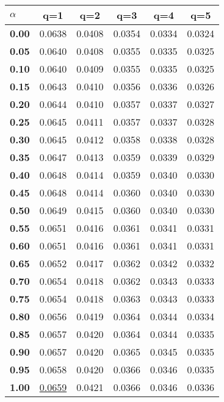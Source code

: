 \begin{tabular}{ | l || c | c | c | c | c |}
\hline
\textbf{$\alpha$} & \textbf{}q=1} & \textbf{}q=2} & \textbf{}q=3} & \textbf{}q=4} & \textbf{}q=5} \\
\hline
\textbf{0.00} & 0.0638 & 0.0408 & 0.0354 & 0.0334 & 0.0324\\
\hline
\textbf{0.05} & 0.0640 & 0.0408 & 0.0355 & 0.0335 & 0.0325\\
\hline
\textbf{0.10} & 0.0640 & 0.0409 & 0.0355 & 0.0335 & 0.0325\\
\hline
\textbf{0.15} & 0.0643 & 0.0410 & 0.0356 & 0.0336 & 0.0326\\
\hline
\textbf{0.20} & 0.0644 & 0.0410 & 0.0357 & 0.0337 & 0.0327\\
\hline
\textbf{0.25} & 0.0645 & 0.0411 & 0.0357 & 0.0337 & 0.0328\\
\hline
\textbf{0.30} & 0.0645 & 0.0412 & 0.0358 & 0.0338 & 0.0328\\
\hline
\textbf{0.35} & 0.0647 & 0.0413 & 0.0359 & 0.0339 & 0.0329\\
\hline
\textbf{0.40} & 0.0648 & 0.0414 & 0.0359 & 0.0340 & 0.0330\\
\hline
\textbf{0.45} & 0.0648 & 0.0414 & 0.0360 & 0.0340 & 0.0330\\
\hline
\textbf{0.50} & 0.0649 & 0.0415 & 0.0360 & 0.0340 & 0.0330\\
\hline
\textbf{0.55} & 0.0651 & 0.0416 & 0.0361 & 0.0341 & 0.0331\\
\hline
\textbf{0.60} & 0.0651 & 0.0416 & 0.0361 & 0.0341 & 0.0331\\
\hline
\textbf{0.65} & 0.0652 & 0.0417 & 0.0362 & 0.0342 & 0.0332\\
\hline
\textbf{0.70} & 0.0654 & 0.0418 & 0.0362 & 0.0343 & 0.0333\\
\hline
\textbf{0.75} & 0.0654 & 0.0418 & 0.0363 & 0.0343 & 0.0333\\
\hline
\textbf{0.80} & 0.0656 & 0.0419 & 0.0364 & 0.0344 & 0.0334\\
\hline
\textbf{0.85} & 0.0657 & 0.0420 & 0.0364 & 0.0344 & 0.0335\\
\hline
\textbf{0.90} & 0.0657 & 0.0420 & 0.0365 & 0.0345 & 0.0335\\
\hline
\textbf{0.95} & 0.0658 & 0.0420 & 0.0366 & 0.0346 & 0.0335\\
\hline
\textbf{1.00} & \underline{0.0659} & 0.0421 & 0.0366 & 0.0346 & 0.0336\\
\hline
\end{tabular}
